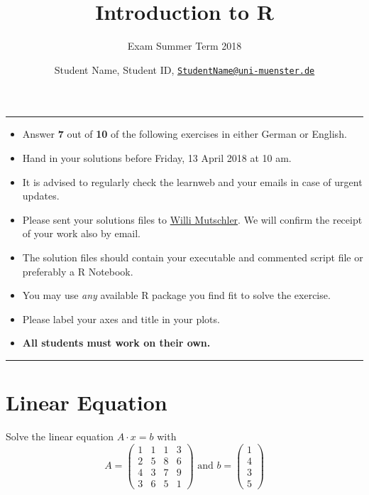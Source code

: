\documentclass[]{article}
\title{Introduction to R}
\subtitle{Exam Summer Term 2018}
\author{Student Name, Student ID,
\href{mailto:StudentName@uni-muenster.de}{\nolinkurl{StudentName@uni-muenster.de}}}
\date{}
\begin{document}
\maketitle

{
\setcounter{tocdepth}{2}
\tableofcontents
}
\begin{center}\rule{0.5\linewidth}{\linethickness}\end{center}

\begin{itemize}
\item
  Answer \textbf{7} out of \textbf{10} of the following exercises in
  either German or English.
\item
  Hand in your solutions before Friday, 13 April 2018 at 10 am.
\item
  It is advised to regularly check the learnweb and your emails in case
  of urgent updates.
\item
  Please sent your solutions files to
  \href{mailto:willi.mutschler@wiwi.uni-muenster.de?subject=Exam\%20Intro\%20R}{Willi
  Mutschler}. We will confirm the receipt of your work also by email.
\item
  The solution files should contain your executable and commented script
  file or preferably a R Notebook.
\item
  You may use \emph{any} available R package you find fit to solve the
  exercise.
\item
  Please label your axes and title in your plots.
\item
  \textbf{All students must work on their own.}
\end{itemize}

\begin{center}\rule{0.5\linewidth}{\linethickness}\end{center}

\pagebreak

\section{Linear Equation}\label{linear-equation}

Solve the linear equation \(A\cdot x = b\) with \[
A = \begin{pmatrix} 1 & 1 & 1 & 3\\ 2 & 5 & 8 & 6\\ 4 & 3 & 7 & 9\\ 3 & 6 & 5 & 1 \end{pmatrix} \text{ and }
b = \begin{pmatrix} 1 \\ 4 \\ 3 \\ 5 \end{pmatrix}
\]
\end{document}
